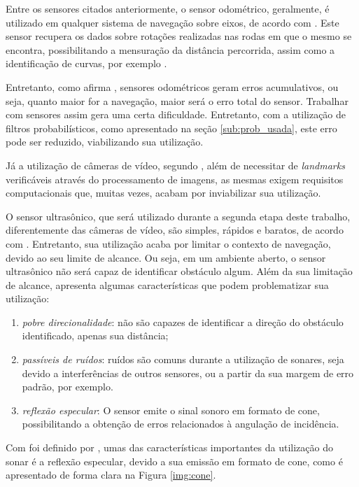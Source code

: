 			Entre os sensores citados anteriormente, o sensor odométrico, geralmente, é utilizado em qualquer sistema de navegação sobre eixos, de acordo com \cite{explore_marte}. Este sensor recupera os dados sobre rotações realizadas nas rodas em que o mesmo se encontra, possibilitando a mensuração da distância percorrida, assim como a identificação de curvas, por exemplo \cite{ROB:1764504}.

			Entretanto, como afirma \cite{iterated_Dslam}, sensores odométricos geram erros acumulativos, ou seja, quanto maior for a navegação, maior será o erro total do sensor. Trabalhar com sensores assim gera uma certa dificuldade. Entretanto, com a utilização de filtros probabilísticos, como apresentado na seção \ref{sub:prob_usada}, este erro pode ser reduzido, viabilizando sua utilização.

			Já a utilização de câmeras de vídeo, segundo \cite{agenteExploratorioKalman}, além de necessitar de \textit{landmarks} verificáveis através do processamento de imagens, as mesmas exigem requisitos computacionais que, muitas vezes, acabam por inviabilizar sua utilização.

			O sensor ultrasônico, que será utilizado durante a segunda etapa deste trabalho, diferentemente das câmeras de vídeo, são simples, rápidos e baratos, de acordo com \cite{agenteExploratorioKalman}. Entretanto, sua utilização acaba por limitar o contexto de navegação, devido ao seu limite de alcance. Ou seja, em um ambiente aberto, o sensor ultrasônico não será capaz de identificar obstáculo algum. Além da sua limitação de alcance, \cite{agenteExploratorioKalman} apresenta algumas características que podem problematizar sua utilização:

			\begin{enumerate}
				\item \textit{pobre direcionalidade}: não são capazes de identificar a direção do obstáculo identificado, apenas sua distância;
				\item \textit{passíveis de ruídos}: ruídos são comuns durante a utilização de sonares, seja devido a interferências de outros sensores, ou a partir da sua margem de erro padrão, por exemplo.
				\item \textit{reflexão especular}: O sensor emite o sinal sonoro em formato de cone, possibilitando a obtenção de erros relacionados à angulação de incidência.
			\end{enumerate}

			Com foi definido por \cite{agenteExploratorioKalman}, umas das características importantes da utilização do sonar é a reflexão especular, devido a sua emissão em formato de cone, como é apresentado de forma clara na Figura \ref{img:cone}.

